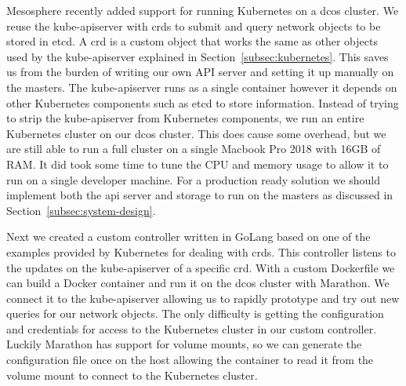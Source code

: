 Mesosphere recently added support for running Kubernetes on a \gls{dcos} cluster. We reuse the kube-apiserver with \glspl{crd} to submit and query network objects to be stored in etcd. A \gls{crd} is a custom object that works the same as other objects used by the kube-apiserver explained in Section~\ref{subsec:kubernetes}. This saves us from the burden of writing our own API server and setting it up manually on the masters. The kube-apiserver runs as a single container however it depends on other Kubernetes components such as etcd to store information. Instead of trying to strip the kube-apiserver from Kubernetes components, we run an entire Kubernetes cluster on our \gls{dcos} cluster. This does cause some overhead, but we are still able to run a full cluster on a single Macbook Pro 2018 with 16GB of RAM. It did took some time to tune the CPU and memory usage to allow it to run on a single developer machine. For a production ready solution we should implement both the \gls{api} server and storage to run on the masters as discussed in Section~\ref{subsec:system-design}.

Next we created a custom controller written in GoLang\cite{golang} based on one of the examples provided by Kubernetes for dealing with \glspl{crd}. This controller listens to the updates on the kube-apiserver of a specific \gls{crd}. With a custom Dockerfile we can build a Docker container and run it on the \gls{dcos} cluster with Marathon. We connect it to the kube-apiserver allowing us to rapidly prototype and try out new queries for our network objects. The only difficulty is getting the configuration and credentials for access to the Kubernetes cluster in our custom controller. Luckily Marathon has support for volume mounts, so we can generate the configuration file once on the host allowing the container to read it from the volume mount to connect to the Kubernetes cluster.

